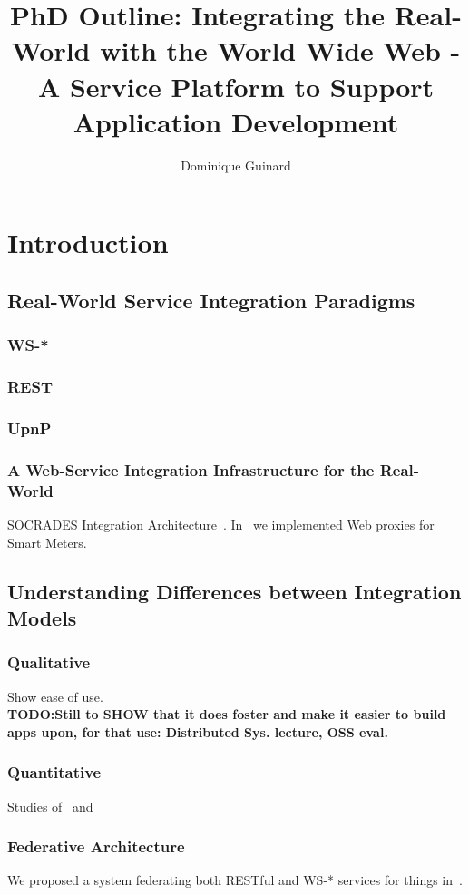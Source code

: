 \documentclass[a4paper,10pt]{report}
\title{PhD Outline: Integrating the Real-World with the World Wide Web - A Service Platform to Support Application Development}
\author{Dominique Guinard}
\newcommand{\todo}[1]{\\ \textbf{TODO:#1} \\}
\begin{document}
\maketitle

\chapter{Introduction}

  \section{Real-World Service Integration Paradigms}
    \subsection{WS-*}
    \subsection{REST}
    \subsection{UpnP}
    \subsection{A Web-Service Integration Infrastructure for the Real-World}
    SOCRADES Integration Architecture~\cite{souza_socrades:web_2008,guinard_tsc}.  In~\cite{dominique_guinard_are_2009} we implemented Web proxies for Smart Meters.

  \section{Understanding Differences between Integration Models}
    \subsection{Qualitative}
    Show ease of use.
    \todo{Still to SHOW that it does foster and make it easier to build apps upon, for that use: Distributed Sys. lecture, OSS eval.}
    \subsection{Quantitative}
    Studies of~\cite{guinard_resource_2010} and~\cite{guinard_giving_2010}
    \subsection{Federative Architecture}
    We proposed a system federating both RESTful and WS-* services for things in~\cite{guinard_tsc}.
\end{document}
